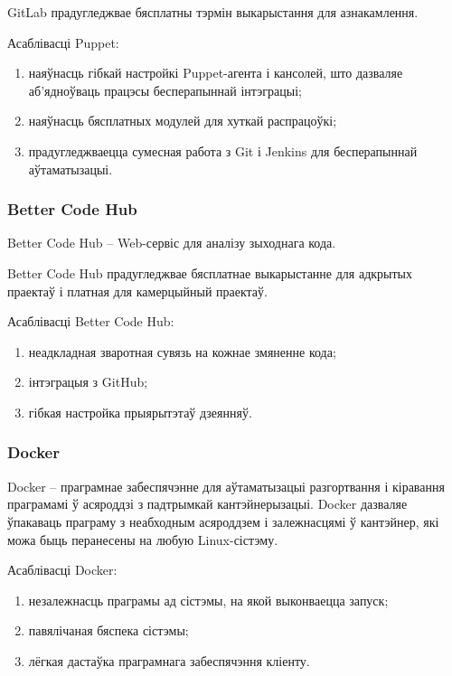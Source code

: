 GitLab прадугледжвае бясплатны тэрмін выкарыстання для азнакамлення.

Асаблівасці Puppet:
\begin{enumerate}
    \item наяўнасць гібкай настройкі Puppet-агента і кансолей, што
          дазваляе аб'ядноўваць працэсы бесперапыннай інтэграцыі;
    \item наяўнасць бясплатных модулей для хуткай распрацоўкі;
    \item прадугледжваецца сумесная работа з Git і Jenkins для
          бесперапыннай аўтаматызацыі.
\end{enumerate}

\subsubsection{Better Code Hub}

Better Code Hub -- Web-сервіс для аналізу зыходнага кода.

Better Code Hub прадугледжвае бясплатнае выкарыстанне
для адкрытых праектаў і платная для камерцыйный праектаў.

Асаблівасці Better Code Hub:
\begin{enumerate}
    \item неадкладная зваротная сувязь на кожнае змяненне кода;
    \item інтэграцыя з GitHub;
    \item гібкая настройка прыярытэтаў дзеянняў.
\end{enumerate}

\subsubsection{Docker}

Docker -- праграмнае забеспячэнне для аўтаматызацыі разгортвання і
кіравання праграмамі ў асяроддзі з падтрымкай кантэйнерызацыі.
Docker дазваляе ўпакаваць праграму з неабходным асяроддзем і
залежнасцямі ў кантэйнер, які можа быць перанесены на любую
Linux-сістэму.

Асаблівасці Docker:
\begin{enumerate}
    \item незалежнасць праграмы ад сістэмы, на якой выконваецца
          запуск;
    \item павялічаная бяспека сістэмы;
    \item лёгкая дастаўка праграмнага забеспячэння кліенту.
\end{enumerate}


